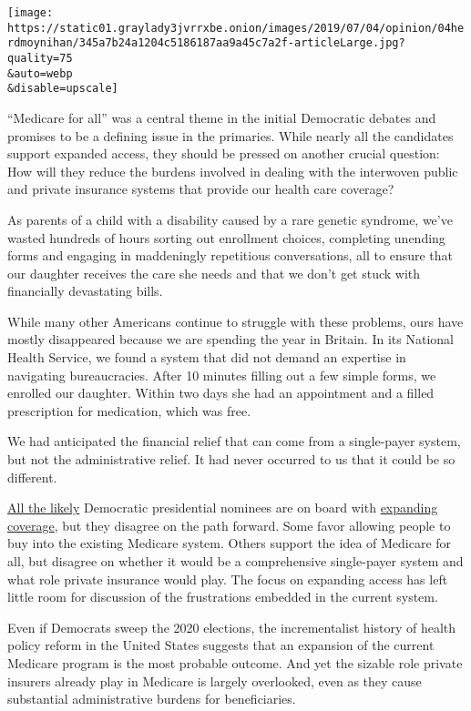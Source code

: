 \texttt{[image: https://static01.graylady3jvrrxbe.onion/images/2019/07/04/opinion/04herdmoynihan/345a7b24a1204c5186187aa9a45c7a2f-articleLarge.jpg?quality=75\\\&auto=webp\\\&disable=upscale]}

``Medicare for all'' was a central theme in the initial Democratic
debates and promises to be a defining issue in the primaries. While
nearly all the candidates support expanded access, they should be
pressed on another crucial question: How will they reduce the burdens
involved in dealing with the interwoven public and private insurance
systems that provide our health care coverage?

As parents of a child with a disability caused by a rare genetic
syndrome, we've wasted hundreds of hours sorting out enrollment choices,
completing unending forms and engaging in maddeningly repetitious
conversations, all to ensure that our daughter receives the care she
needs and that we don't get stuck with financially devastating bills.

While many other Americans continue to struggle with these problems,
ours have mostly disappeared because we are spending the year in
Britain. In its National Health Service, we found a system that did not
demand an expertise in navigating bureaucracies. After 10 minutes
filling out a few simple forms, we enrolled our daughter. Within two
days she had an appointment and a filled prescription for medication,
which was free.

We had anticipated the financial relief that can come from a
single-payer system, but not the administrative relief. It had never
occurred to us that it could be so different.

\href{https://www.nytimes3xbfgragh.onion/2019/06/23/us/politics/2020-democrats-medicare-for-all-public-option.html?module=inline}{All
the likely} Democratic presidential nominees are on board with
\href{https://www.kff.org/medicare/issue-brief/medicare-for-all-and-public-plan-buy-in-proposals-overview-and-key-issues/}{expanding
coverage}, but they disagree on the path forward. Some favor allowing
people to buy into the existing Medicare system. Others support the idea
of Medicare for all, but disagree on whether it would be a comprehensive
single-payer system and what role private insurance would play. The
focus on expanding access has left little room for discussion of the
frustrations embedded in the current system.

Even if Democrats sweep the 2020 elections, the incrementalist history
of health policy reform in the United States suggests that an expansion
of the current Medicare program is the most probable outcome. And yet
the sizable role private insurers already play in Medicare is largely
overlooked, even as they cause substantial administrative burdens for
beneficiaries.

